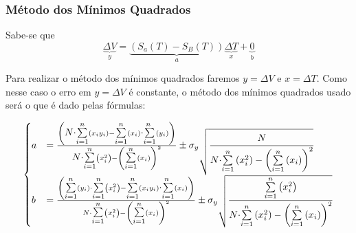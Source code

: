 \documentclass[a4paper]{article}
\begin{document}
		\subsubsection{Método dos Mínimos Quadrados}

			Sabe-se que 
			\begin{equation}
				\underset{y}{\underbrace{\Delta V}}=\underset{a}{\underbrace{\left(S_{a}(T)-S_{B}(T)\right)}}\underset{x}{\underbrace{\Delta T}}+\underset{b}{\underbrace{0}}
			\end{equation}
			
			Para realizar o método dos mínimos quadrados faremos $y=\Delta V$ e $x=\Delta T$. Como nesse caso o erro em $y=\Delta V$ é constante, o método dos mínimos quadrados usado será o que é dado pelas fórmulas:

			\[
			\begin{cases}
				a & =\frac{\left({\displaystyle {\displaystyle N\cdot}{\scriptscriptstyle {\textstyle \overset{n}{\underset{i=1}{\sum}}}}}\left(x_{i}y_{i}\right)-{\displaystyle {\scriptscriptstyle {\textstyle \overset{n}{\underset{i=1}{\sum}}}}}\left(x_{i}\right){\scriptscriptstyle {\textstyle \overset{n}{\cdot\underset{i=1}{\sum}}}}\left(y_{i}\right)\right)}{{\displaystyle {\displaystyle N\cdot}{\scriptscriptstyle {\textstyle \overset{n}{\underset{i=1}{\sum}}}}}\left(x_{i}^{2}\right)-\left({\displaystyle {\scriptscriptstyle {\textstyle \overset{n}{\underset{i=1}{\sum}}}}}\left(x_{i}\right)\right)^{2}}\pm\sigma_{y}\sqrt{\cfrac{{\displaystyle {\displaystyle {\displaystyle N}}}}{{\displaystyle {\displaystyle N\cdot}{\scriptscriptstyle {\textstyle \overset{n}{\underset{i=1}{\sum}}}}}\left(x_{i}^{2}\right)-\left({\displaystyle {\scriptscriptstyle {\textstyle \overset{n}{\underset{i=1}{\sum}}}}}\left(x_{i}\right)\right)^{2}}}\\
				b & =\frac{\left({\displaystyle {\scriptscriptstyle {\textstyle \overset{n}{\underset{i=1}{\sum}}}}}\left(y_{i}\right)\cdot{\displaystyle {\scriptscriptstyle {\textstyle \overset{n}{\underset{i=1}{\sum}}}}}\left(x_{i}^{2}\right)-{\displaystyle {\scriptscriptstyle {\textstyle \overset{n}{\underset{i=1}{\sum}}}}}\left(x_{i}y_{i}\right){\scriptscriptstyle {\textstyle \overset{n}{\cdot\underset{i=1}{\sum}}}}\left(x_{i}\right)\right)}{N\cdot{\displaystyle {\scriptscriptstyle {\textstyle \overset{n}{\underset{i=1}{\sum}}}}}\left(x_{i}^{2}\right)-\left({\displaystyle {\scriptscriptstyle {\textstyle \overset{n}{\underset{i=1}{\sum}}}}}\left(x_{i}\right)\right)^{2}}\pm\sigma_{y}\sqrt{\cfrac{{\displaystyle {\scriptscriptstyle {\textstyle \overset{n}{\underset{i=1}{\sum}}}}}\left(x_{i}^{2}\right)}{{\displaystyle {\displaystyle N\cdot}{\scriptscriptstyle {\textstyle \overset{n}{\underset{i=1}{\sum}}}}}\left(x_{i}^{2}\right)-\left({\displaystyle {\scriptscriptstyle {\textstyle \overset{n}{\underset{i=1}{\sum}}}}}\left(x_{i}\right)\right)^{2}}}
			\end{cases}
			\]
\end{document}
